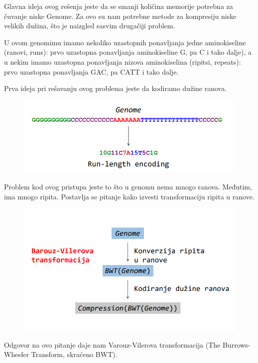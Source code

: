Glavna ideja ovog rešenja jeste da se smanji količina memorije potrebna za čuvanje niske Genome. Za ovo su nam potrebne metode za kompresiju niske velikih dužina, što je naizgled sasvim drugačiji problem.

U ovom genomimu imamo nekoliko uzastopnih ponavljanja jedne aminokiseline (ranovi, runs): prvo uzastopna ponavljanja aminokiseline G, pa C i tako dalje), a u nekim imamo uzastopna ponavljanja nizova aminokiselina (ripitsi, repeats): prvo uzastopna ponavljanja GAC, pa CATT i tako dalje.

Prva ideja pri rešavanju ovog problema jeste da kodiramo dužine ranova.
\begin{figure}[h!]
\centering
\includegraphics[scale=0.5]{poglavlja/9/slike/kompresijaGenoma.png}
\caption{}
\label{slika:X}
\end{figure}

Problem kod ovog pristupa jeste to što u genomu nema mnogo ranova. Međutim, ima mnogo ripita.
Postavlja se pitanje kako izvesti transformaciju ripita u ranove.
\begin{figure}[h!]
\centering
\includegraphics[scale=0.5]{poglavlja/9/slike/konversijaRipitaUranove.png}
\caption{}
\label{slika:X}
\end{figure}

Odgovor na ovo pitanje daje nam Varouz-Vilerova transformacija (The Burrows-Wheeler Transform, skraćeno BWT).


